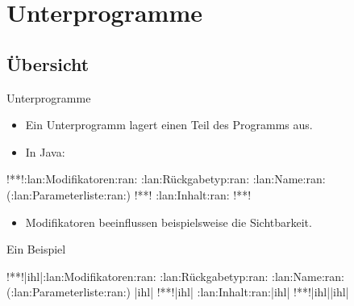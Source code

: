{\section{Unterprogramme}
\subsection{Übersicht}
\begin{frame}[fragile,c]{Unterprogramme}
   \begin{itemize}[<+(1)->]
      \itemsep11pt
      \item Ein Unterprogramm lagert einen Teil des Programms aus.
      \item In Java: \vspace*{-8\baselineskip}
   \end{itemize}
\begin{layout-imageonly}
\begin{plainjava}
!**!:lan:Modifikatoren:ran: :lan:Rückgabetyp:ran: :lan:Name:ran:(:lan:Parameterliste:ran:) {
!**!   :lan:Inhalt:ran:
!**!}
\end{plainjava}\vspace*{-9\baselineskip}
\end{layout-imageonly}
   \begin{itemize}[<+(1)->]
      \itemsep11pt
      \item<5-> Modifikatoren beeinflussen beispielsweise die Sichtbarkeit.
   \end{itemize}
\end{frame}

\begin{frame}[fragile,c]{Ein Beispiel}
\SetupLstHl\begin{layout-imageonly}
\begin{plainjava}
!**!|ihl|:lan:Modifikatoren:ran: :lan:Rückgabetyp:ran: :lan:Name:ran:(:lan:Parameterliste:ran:) {|ihl|
!**!|ihl|   :lan:Inhalt:ran:|ihl|
!**!|ihl|}|ihl|





\end{plainjava}
\end{layout-imageonly}
\end{frame}}
